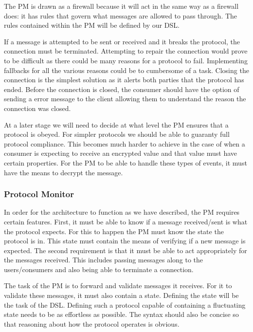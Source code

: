 The PM is drawn as a firewall because it will act in the same way as a firewall does: it has rules that govern what messages are allowed to pass through. The rules contained within the PM will be defined by our DSL.

If a message is attempted to be sent or received and it breaks the protocol, the connection must be terminated. Attempting to repair the connection would prove to be difficult as there could be many reasons for a protocol to fail. Implementing fallbacks for all the various reasons could be to cumbersome of a task. Closing the connection is the simplest solution as it alerts both parties that the protocol has ended. Before the connection is closed, the consumer should have the option of sending a error message to the client allowing them to understand the reason the connection was closed.


At a later stage we will need to decide at what level the PM ensures that a protocol is obeyed. For simpler protocols we should be able to guaranty full protocol compliance. This becomes much harder to achieve in the case of when a consumer is expecting to receive an encrypted value and that value must have certain properties. For the PM to be able to handle these types of events, it must have the means to decrypt the message.

\subsubsection{Protocol Monitor}
In order for the architecture to function as we have described, the PM requires certain features. First, it must be able to know if a message received/sent is what the protocol expects. For this to happen the PM must know the state the protocol is in. This state must contain the means of verifying if a new message is expected. The second requirement is that it must be able to act appropriately for the messages received. This includes passing messages along to the users/consumers and also being able to terminate a connection.

The task of the PM is to forward and validate messages it receives. For it to validate these messages, it must also contain a state. Defining the state will be the task of the DSL. Defining such a protocol capable of containing a fluctuating state needs to be as effortless as possible. The syntax should also be concise so that reasoning about how the protocol operates is obvious.

